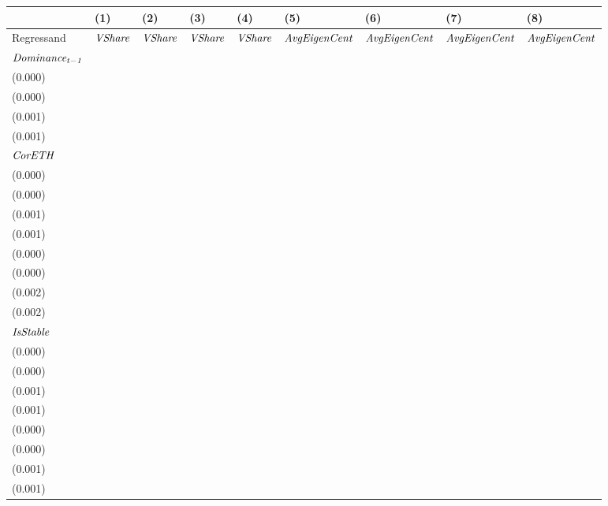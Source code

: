 \begin{tabular}{lllllllll}
\toprule
{} &                                  (1) &                                  (2) &                                  (3) &                                  (4) &                                  (5) &                                  (6) &                                  (7) &                                  (8) \\
\midrule
Regressand            &                       ${\it VShare}$ &                       ${\it VShare}$ &                       ${\it VShare}$ &                       ${\it VShare}$ &                 ${\it AvgEigenCent}$ &                 ${\it AvgEigenCent}$ &                 ${\it AvgEigenCent}$ &                 ${\it AvgEigenCent}$ \\
$\it Dominance_{t-1}$ &  \makecell{$0.995^{***}$ \\ (0.000)} &  \makecell{$0.995^{***}$ \\ (0.000)} &                          \makecell{} &                          \makecell{} &  \makecell{$0.987^{***}$ \\ (0.001)} &  \makecell{$0.987^{***}$ \\ (0.001)} &                          \makecell{} &                          \makecell{} \\
${\it CorETH}$        &     \makecell{$0.000^{}$ \\ (0.000)} &    \makecell{$0.000^{*}$ \\ (0.000)} &  \makecell{$0.036^{***}$ \\ (0.001)} &  \makecell{$0.033^{***}$ \\ (0.001)} &    \makecell{$0.001^{*}$ \\ (0.000)} &    \makecell{$0.001^{*}$ \\ (0.000)} &  \makecell{$0.057^{***}$ \\ (0.002)} &  \makecell{$0.044^{***}$ \\ (0.002)} \\
${\it IsStable}$      &  \makecell{$0.000^{***}$ \\ (0.000)} &  \makecell{$0.000^{***}$ \\ (0.000)} &  \makecell{$0.048^{***}$ \\ (0.001)} &  \makecell{$0.048^{***}$ \\ (0.001)} &  \makecell{$0.002^{***}$ \\ (0.000)} &  \makecell{$0.002^{***}$ \\ (0.000)} &  \makecell{$0.125^{***}$ \\ (0.001)} &  \makecell{$0.126^{***}$ \\ (0.001)} \\

\end{tabular}
